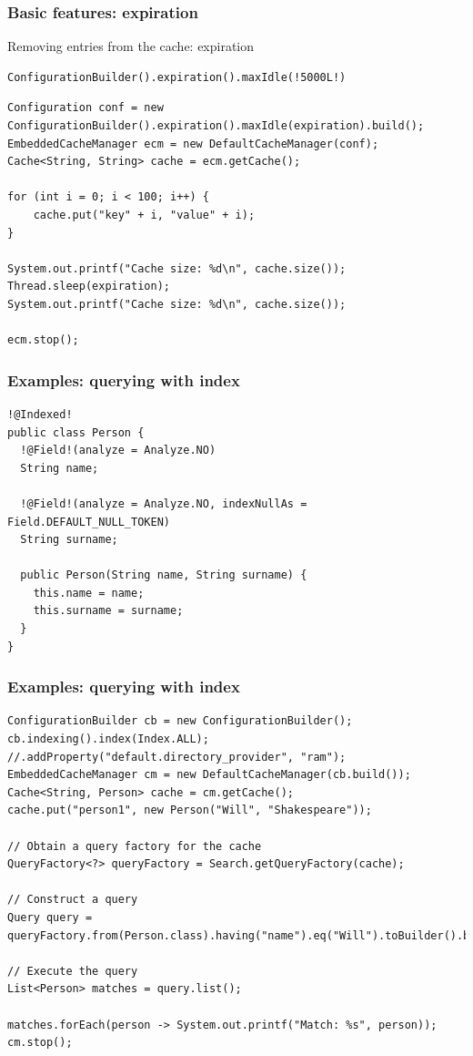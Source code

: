 \documentclass[10pt,utf8]{beamer}
\begin{document}
\begin{frame}[fragile]
	\frametitle{Basic features: expiration}
	Removing entries from the cache: expiration
	\begin{lstlisting}[style=Java]
ConfigurationBuilder().expiration().maxIdle(!5000L!)
	\end{lstlisting}
	
	\begin{lstlisting}[style=Java]
Configuration conf = new ConfigurationBuilder().expiration().maxIdle(expiration).build();
EmbeddedCacheManager ecm = new DefaultCacheManager(conf);
Cache<String, String> cache = ecm.getCache();

for (int i = 0; i < 100; i++) {
    cache.put("key" + i, "value" + i);
}

System.out.printf("Cache size: %d\n", cache.size());
Thread.sleep(expiration);
System.out.printf("Cache size: %d\n", cache.size());

ecm.stop();
	\end{lstlisting}
\end{frame}


\begin{frame}[fragile]
	\frametitle{Examples: querying with index}
	\begin{lstlisting}[style=Java]
!@Indexed!
public class Person {
  !@Field!(analyze = Analyze.NO)
  String name;

  !@Field!(analyze = Analyze.NO, indexNullAs = Field.DEFAULT_NULL_TOKEN)
  String surname;

  public Person(String name, String surname) {
    this.name = name;
    this.surname = surname;
  }
}
	\end{lstlisting}
\end{frame}

\begin{frame}[fragile]
	\frametitle{Examples: querying with index}
	\begin{lstlisting}[style=Java]
ConfigurationBuilder cb = new ConfigurationBuilder();
cb.indexing().index(Index.ALL); //.addProperty("default.directory_provider", "ram");
EmbeddedCacheManager cm = new DefaultCacheManager(cb.build());
Cache<String, Person> cache = cm.getCache();
cache.put("person1", new Person("Will", "Shakespeare"));
      
// Obtain a query factory for the cache
QueryFactory<?> queryFactory = Search.getQueryFactory(cache);

// Construct a query
Query query = queryFactory.from(Person.class).having("name").eq("Will").toBuilder().build();
      
// Execute the query
List<Person> matches = query.list();

matches.forEach(person -> System.out.printf("Match: %s", person));
cm.stop();
	\end{lstlisting}
\end{frame}
\end{document}
